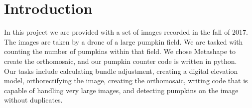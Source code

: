 \documentclass[../Head/Main.tex]{subfiles}
\begin{document}
\section{Introduction}
In this project we are provided with a set of images recorded in the fall of 2017.
The images are taken by a drone of a large pumpkin field.
We are tasked with counting the number of pumpkins within that ﬁeld.
We chose Metashape to create the orthomosaic, and our pumpkin counter code is written in python.\\
Our tasks include calculating bundle adjustment,
creating a digital elevation model,
orthorectifying the image,
creating the orthomosaic,
writing code that is capable of handling very large images,
and detecting pumpkins on the image without duplicates.
\end{document}
